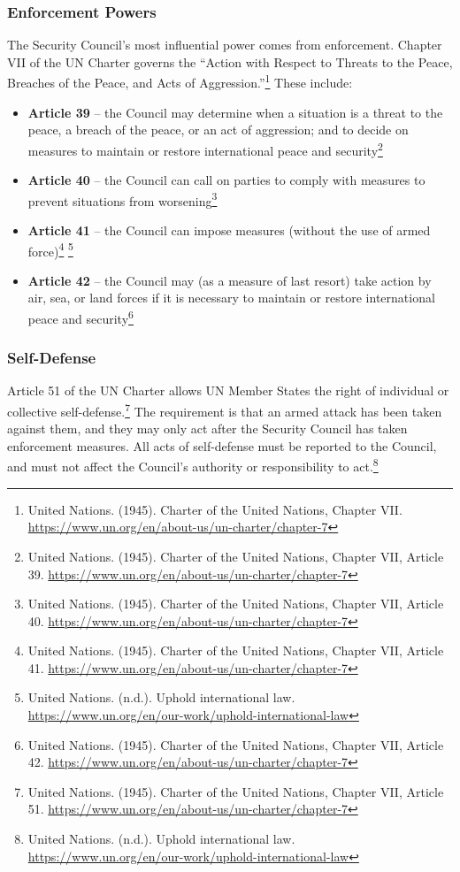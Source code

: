 \subsubsection{Enforcement Powers}

The Security Council’s most influential power comes from enforcement. Chapter VII of the UN Charter governs the “Action with Respect to Threats to the Peace, Breaches of the Peace, and Acts of Aggression.”\footnote{United Nations. (1945). Charter of the United Nations, Chapter VII. \url{https://www.un.org/en/about-us/un-charter/chapter-7}} These include:

\begin{itemize}
  \item \textbf{Article 39} -- the Council may determine when a situation is a threat to the peace, a breach of the peace, or an act of aggression; and to decide on measures to maintain or restore international peace and security\footnote{United Nations. (1945). Charter of the United Nations, Chapter VII, Article 39. \url{https://www.un.org/en/about-us/un-charter/chapter-7}}
  \item \textbf{Article 40} -- the Council can call on parties to comply with measures to prevent situations from worsening\footnote{United Nations. (1945). Charter of the United Nations, Chapter VII, Article 40. \url{https://www.un.org/en/about-us/un-charter/chapter-7}}
  \item \textbf{Article 41} -- the Council can impose measures (without the use of armed force)\footnote{United Nations. (1945). Charter of the United Nations, Chapter VII, Article 41. \url{https://www.un.org/en/about-us/un-charter/chapter-7}} \footnote{United Nations. (n.d.). Uphold international law. \url{https://www.un.org/en/our-work/uphold-international-law}}
  \item \textbf{Article 42} -- the Council may (as a measure of last resort) take action by air, sea, or land forces if it is necessary to maintain or restore international peace and security\footnote{United Nations. (1945). Charter of the United Nations, Chapter VII, Article 42. \url{https://www.un.org/en/about-us/un-charter/chapter-7}}
\end{itemize}

\subsubsection{Self-Defense}

Article 51 of the UN Charter allows UN Member States the right of individual or collective self-defense.\footnote{United Nations. (1945). Charter of the United Nations, Chapter VII, Article 51. \url{https://www.un.org/en/about-us/un-charter/chapter-7}} The requirement is that an armed attack has been taken against them, and they may only act after the Security Council has taken enforcement measures. All acts of self-defense must be reported to the Council, and must not affect the Council’s authority or responsibility to act.\footnote{United Nations. (n.d.). Uphold international law. \url{https://www.un.org/en/our-work/uphold-international-law}}


